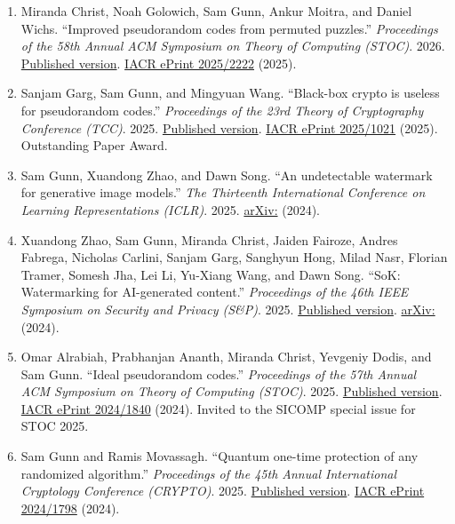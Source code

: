 \documentclass[line,margin]{res}
\begin{document}
\begin{resume}
\begin{enumerate}
\item Miranda Christ, Noah Golowich, Sam Gunn, Ankur Moitra, and Daniel Wichs. ``Improved pseudorandom codes from permuted puzzles.'' \emph{Proceedings of the 58th Annual ACM Symposium on Theory of Computing (STOC)}. 2026. \href{https://doi.org/10.1145/3798129.3800916}{Published version}. \href{https://eprint.iacr.org/2025/2222}{IACR ePrint 2025/2222} (2025).

\item Sanjam Garg, Sam Gunn, and Mingyuan Wang. ``Black-box crypto is useless for pseudorandom codes.'' \emph{Proceedings of the 23rd Theory of Cryptography Conference (TCC)}. 2025. \href{https://doi.org/10.1007/978-3-032-12290-2_7}{Published version}. \href{https://eprint.iacr.org/2025/1021}{IACR ePrint 2025/1021} (2025). Outstanding Paper Award.

\item Sam Gunn, Xuandong Zhao, and Dawn Song. ``An undetectable watermark for generative image models.'' \emph{The Thirteenth International Conference on Learning Representations (ICLR)}. 2025. \href{https://arxiv.org/abs/2410.07369}{arXiv:} (2024).

\item Xuandong Zhao, Sam Gunn, Miranda Christ, Jaiden Fairoze, Andres Fabrega, Nicholas Carlini, Sanjam Garg, Sanghyun Hong, Milad Nasr, Florian Tramer, Somesh Jha, Lei Li, Yu-Xiang Wang, and Dawn Song. ``SoK: Watermarking for AI-generated content.'' \emph{Proceedings of the 46th IEEE Symposium on Security and Privacy (S\&P)}. 2025. \href{https://doi.org/10.1109/SP61157.2025.00178}{Published version}. \href{https://arxiv.org/abs/2411.18479}{arXiv:} (2024).

\item Omar Alrabiah, Prabhanjan Ananth, Miranda Christ, Yevgeniy Dodis, and Sam Gunn. ``Ideal pseudorandom codes.'' \emph{Proceedings of the 57th Annual ACM Symposium on Theory of Computing (STOC)}. 2025. \href{https://doi.org/10.1145/3717823.3718309}{Published version}. \href{https://eprint.iacr.org/2024/1840}{IACR ePrint 2024/1840} (2024). Invited to the SICOMP special issue for STOC 2025.

\item Sam Gunn and Ramis Movassagh. ``Quantum one-time protection of any randomized algorithm.'' \emph{Proceedings of the 45th Annual International Cryptology Conference (CRYPTO)}. 2025. \href{https://doi.org/10.1007/978-3-032-01878-6_11}{Published version}. \href{https://eprint.iacr.org/2024/1798}{IACR ePrint 2024/1798} (2024).


\end{enumerate}
\end{resume}
\end{document}
